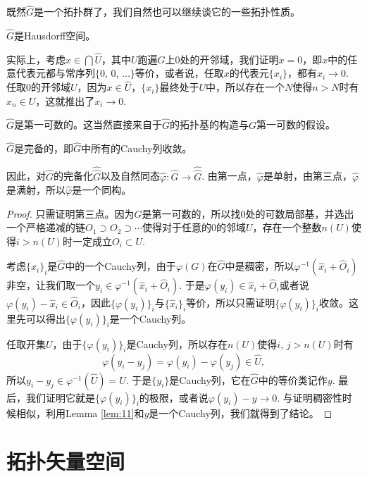 \begin{para}
	既然$\hat{G}$是一个拓扑群了，我们自然也可以继续谈它的一些拓扑性质。
	\begin{compactenum}
	\item $\hat{G}$是Hausdorff空间。

		实际上，考虑$x\in \bigcap\hat{U}$，其中$U$跑遍$G$上$0$处的开邻域，我们证明$x=0$，即$x$中的任意代表元都与常序列$\{0$, $0$, $\dots\}$等价，或者说，任取$x$的代表元$\{x_i\}$，都有$x_i\to 0$. 任取$0$的开邻域$U$，因为$x\in \hat{U}$，$\{x_i\}$最终处于$U$中，所以存在一个$N$使得$n>N$时有$x_n\in U$，这就推出了$x_i\to 0$.
	\item $\hat{G}$是第一可数的。这当然直接来自于$\hat{G}$的拓扑基的构造与$G$第一可数的假设。

	\item $\hat{G}$是完备的，即$\hat{G}$中所有的Cauchy列收敛。
	\item 因此，对$\hat{G}$的完备化$\hat{\hat G}$以及自然同态$\hat\varphi:\hat{G}\to\hat{\hat G}$. 由第一点，$\hat\varphi$是单射，由第三点，$\hat\varphi$是满射，所以$\hat\varphi$是一个同构。
	\end{compactenum}

	\begin{proof}
		只需证明第三点。因为$G$是第一可数的，所以找$0$处的可数局部基，并选出一个严格递减的链$O_1\supset O_2\supset \cdots$使得对于任意的$0$的邻域$U$，存在一个整数$n(U)$使得$i>n(U)$时一定成立$O_i\subset U$. 

		考虑$\{\hat{x}_i\}_i$是$\hat{G}$中的一个Cauchy列，由于$\varphi(G)$在$\hat{G}$中是稠密，所以$\varphi^{-1}(\hat{x}_i+\hat{O}_i)$非空，让我们取一个$y_i\in\varphi^{-1}(\hat{x}_i+\hat{O}_i)$. 于是$\varphi(y_i)\in \hat{x}_i+\hat{O}_i$或者说$\varphi(y_i)-\hat{x}_i\in \hat{O}_i$，因此$\{\varphi(y_i)\}_i$与$\{\hat{x}_i\}_i$等价，所以只需证明$\{\varphi(y_i)\}_i$收敛。这里先可以得出$\{\varphi(y_i)\}_i$是一个Cauchy列。

		任取开集$U$，由于$\{\varphi(y_i)\}_i$是Cauchy列，所以存在$n(U)$使得$i$, $j>n(U)$时有
		\[
		\varphi(y_i-y_j)=\varphi(y_i)-\varphi(y_j)\in \hat{U},
		\]
		所以$y_i-y_j\in \varphi^{-1}(\hat{U})=U$. 于是$\{y_i\}$是Cauchy列，它在$\hat G$中的等价类记作$y$. 最后，我们证明它就是$\{\varphi(y_i)\}_i$的极限，或者说$\varphi(y_i)-y\to 0$. 与证明稠密性时候相似，利用Lemma \ref{lem:11}和$y$是一个Cauchy列，我们就得到了结论。
	\end{proof}
\end{para}

\section{拓扑矢量空间}


